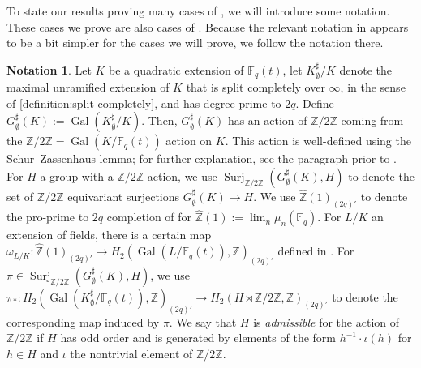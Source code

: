 \documentclass[12 pt]{amsart}
\theoremstyle{plain}
\theoremstyle{definition}
\newtheorem{notation}[theorem]{Notation}
\theoremstyle{remark}
\numberwithin{equation}{section}
\DeclareMathOperator\gal{Gal}
\DeclareMathOperator\surj{Surj}
\begin{document}
To state our results proving many 
cases of \cite[Conjecture
5.1]{wood:nonabelian-cohen-lenstra-moments},
we will introduce some notation.
These cases we prove are also cases of
\cite[Conjecture 1.2]{liu:non-abelian-cohen-lenstra-in-the-presence-of-roots}.
Because the relevant notation in 
\cite{liu:non-abelian-cohen-lenstra-in-the-presence-of-roots}
appears to be a bit simpler for the cases we will prove, we follow the notation
there.
\begin{notation}
	\label{notation:non-abelian}
	Let $K$ be a quadratic extension of $\mathbb F_q(t)$, let
$K^\sharp_\emptyset/K$ denote the maximal unramified extension of $K$ that is
split completely over $\infty$, in the sense of
\autoref{definition:split-completely},
and has degree prime to $2q$.
Define
$G^\sharp_\emptyset(K) := \gal(K^\sharp_\emptyset/K)$.
Then, $G^\sharp_\emptyset(K)$ has an action of $\mathbb Z/2 \mathbb Z$ coming
from the $\mathbb Z/2 \mathbb Z = \gal(K/\mathbb F_q(t))$ action on $K$.
This action is well-defined using the Schur--Zassenhaus lemma; for further
explanation, see the paragraph prior to \cite[Definition
2.1]{liuWZB:a-predicted-distribution}.
For $H$ a group with a $\mathbb Z/2 \mathbb Z$ action,
we use $\surj_{\mathbb Z/2 \mathbb Z}(G^\sharp_\emptyset(K), H)$ to denote the
set of $\mathbb Z/2 \mathbb Z$ equivariant surjections $G^\sharp_\emptyset(K)
\to H$.
We use
$\hat{\mathbb Z}(1)_{(2q)'}$ to denote the pro-prime to $2q$ completion of
for $\widehat{\mathbb Z}(1) := \lim_n \mu_n(\overline{\mathbb F}_q)$.
For $L/K$ an extension of fields, there is a certain map
$\omega_{L/K} : \hat{\mathbb Z}(1)_{(2q)'} \to H_2(\gal(L/\mathbb F_q(t)),
\mathbb Z)_{(2q)'}$ defined in \cite[Definition
2.13]{liu:non-abelian-cohen-lenstra-in-the-presence-of-roots}.
For $\pi \in \surj_{\mathbb Z/2 \mathbb Z}(G^\sharp_\emptyset(K), H)$, we use
$\pi_* : H_2( \gal(K^\sharp_\emptyset/\mathbb F_q(t)), \mathbb Z)_{(2q)'} \to
H_2(H \rtimes \mathbb Z/2 \mathbb Z, \mathbb Z)_{(2q)'}$ to denote the corresponding map
induced by $\pi$.
We say that $H$ is {\em admissible} for the action of $\mathbb Z/2 \mathbb Z$
if $H$ has odd order and is generated 
by elements of the form $h^{-1} \cdot \iota(h)$ for $h \in H$ and
$\iota$ the nontrivial element of $\mathbb Z/2 \mathbb Z$.
\end{notation}
\end{document}
